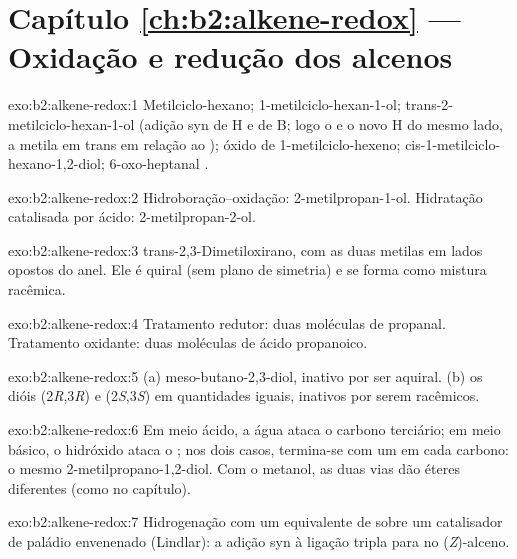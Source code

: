 \section*{Capítulo \ref{ch:b2:alkene-redox} --- Oxidação e redução dos alcenos}

\begin{solution}{exo:b2:alkene-redox:1}
Metilciclo-hexano; 1-metilciclo-hexan-1-ol; trans-2-metilciclo-hexan-1-ol (adição
syn de H e de B; logo o  e o novo H do mesmo lado, a metila em trans em
relação ao ); óxido de 1-metilciclo-hexeno; cis-1-metilciclo-hexano-1,2-diol;
6-oxo-heptanal .
\end{solution}

\begin{solution}{exo:b2:alkene-redox:2}
Hidroboração--oxidação: 2-metilpropan-1-ol. Hidratação catalisada por ácido:
2-metilpropan-2-ol.
\end{solution}

\begin{solution}{exo:b2:alkene-redox:3}
trans-2,3-Dimetiloxirano, com as duas metilas em lados opostos do anel. Ele é
quiral (sem plano de simetria) e se forma como mistura racêmica.
\end{solution}

\begin{solution}{exo:b2:alkene-redox:4}
Tratamento redutor: duas moléculas de propanal. Tratamento oxidante: duas
moléculas de ácido propanoico.
\end{solution}

\begin{solution}{exo:b2:alkene-redox:5}
(a) meso-butano-2,3-diol, inativo por ser aquiral. (b) os dióis
(2\textit{R},3\textit{R}) e (2\textit{S},3\textit{S}) em quantidades iguais, inativos
por serem racêmicos.
\end{solution}

\begin{solution}{exo:b2:alkene-redox:6}
Em meio ácido, a água ataca o carbono terciário; em meio básico, o hidróxido
ataca o ; nos dois casos, termina-se com um  em cada carbono: o
mesmo 2-metilpropano-1,2-diol. Com o metanol, as duas vias dão éteres
diferentes (como no capítulo).
\end{solution}

\begin{solution}{exo:b2:alkene-redox:7}
Hidrogenação com um equivalente de  sobre um catalisador de paládio
envenenado (Lindlar): a adição syn à ligação tripla para no (\textit{Z})-alceno.
\end{solution}


